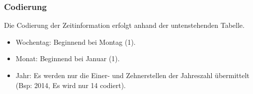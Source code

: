 \begin{figure}
\end{figure}

\newpage

\subsubsection{Codierung}
Die Codierung der Zeitinformation erfolgt anhand der untenstehenden Tabelle.

\begin{itemize}
\item Wochentag: Beginnend bei Montag (1).
\item Monat: Beginnend bei Januar (1).
\item Jahr: Es werden nur die Einer- und Zehnerstellen der Jahreszahl übermittelt (Bsp: 2014, Es wird nur 14 codiert).
\end{itemize}

\newpage

